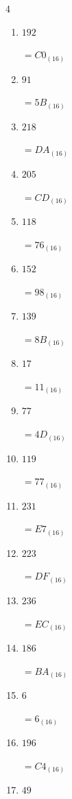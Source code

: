 \begin{multicols}{4}
\begin{enumerate}
  \item $192$

        $=C0_{(16)}$

  \item $91$

        $=5B_{(16)}$

  \item $218$

        $=DA_{(16)}$

  \item $205$

        $=CD_{(16)}$

  \item $118$

        $=76_{(16)}$

  \item $152$

        $=98_{(16)}$

  \item $139$

        $=8B_{(16)}$

  \item $17$

        $=11_{(16)}$

  \item $77$

        $=4D_{(16)}$

  \item $119$

        $=77_{(16)}$

  \item $231$

        $=E7_{(16)}$

  \item $223$

        $=DF_{(16)}$

  \item $236$

        $=EC_{(16)}$

\columnbreak %

  \item $186$

        $=BA_{(16)}$

  \item $6$

        $=6_{(16)}$

  \item $196$

        $=C4_{(16)}$

  \item $49$


\end{enumerate}
\end{multicols}
